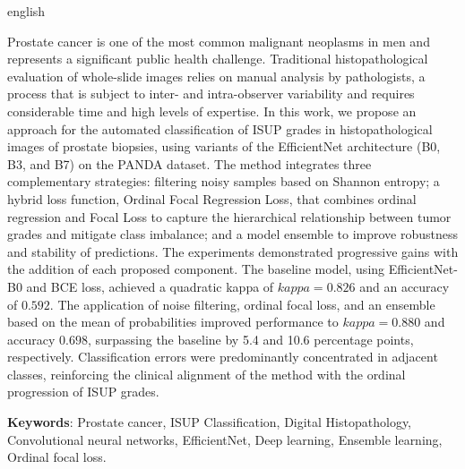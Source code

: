 \documentclass[
12pt,				%
oneside,			%
a4paper,			%
english,			%
french,				%
spanish,			%
brazil				%
]{abntex2}
\begin{document}
		
		\begin{resumo}[Abstract]
			\begin{otherlanguage*}{english}
				
				Prostate cancer is one of the most common malignant neoplasms in men and represents a significant public health challenge. Traditional histopathological evaluation of whole-slide images relies on manual analysis by pathologists, a process that is subject to inter- and intra-observer variability and requires considerable time and high levels of expertise.
				In this work, we propose an approach for the automated classification of ISUP grades in histopathological images of prostate biopsies, using variants of the EfficientNet architecture (B0, B3, and B7) on the PANDA dataset. The method integrates three complementary strategies: filtering noisy samples based on Shannon entropy; a hybrid loss function, Ordinal Focal Regression Loss, that combines ordinal regression and Focal Loss to capture the hierarchical relationship between tumor grades and mitigate class imbalance; and a model ensemble to improve robustness and stability of predictions.
				The experiments demonstrated progressive gains with the addition of each proposed component. The baseline model, using EfficientNet-B0 and BCE loss, achieved a quadratic kappa of $kappa = 0.826$ and an accuracy of $0.592$. The application of noise filtering, ordinal focal loss, and an ensemble based on the mean of probabilities improved performance to $kappa = 0.880$ and accuracy $0.698$, surpassing the baseline by 5.4 and 10.6 percentage points, respectively. Classification errors were predominantly concentrated in adjacent classes, reinforcing the clinical alignment of the method with the ordinal progression of ISUP grades.
				
				\textbf{Keywords}: Prostate cancer, ISUP Classification, Digital Histopathology, Convolutional neural networks, EfficientNet, Deep learning, Ensemble learning, Ordinal focal loss.
			\end{otherlanguage*}
		\end{resumo}
		
		\cleardoublepage
		
		
		\listoffigures*
		\cleardoublepage
		
		\listoftables*
		\cleardoublepage
		
\end{document}
